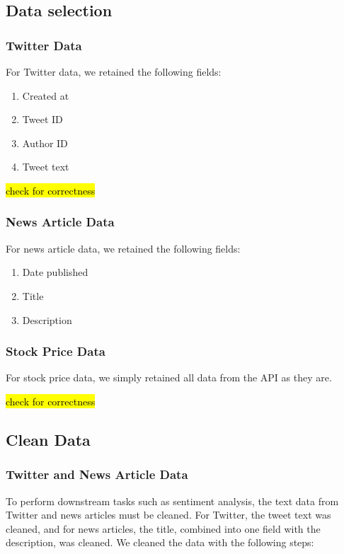 \documentclass[sigconf, nonacm]{acmart}
\begin{document}
\subsection{Data selection} %
\subsubsection{Twitter Data}
For Twitter data, we retained the following fields:
\begin{enumerate}
    \item Created at
    \item Tweet ID
    \item Author ID
    \item Tweet text
\end{enumerate}

\hl{check for correctness}

\subsubsection{News Article Data}
For news article data, we retained the following fields:

\begin{enumerate}
    \item Date published
    \item Title
    \item Description
\end{enumerate}

\subsubsection{Stock Price Data}
For stock price data, we simply retained all data from the API as they are.

\hl{check for correctness}

\subsection{Clean Data} 
\subsubsection{Twitter and News Article Data}
To perform downstream tasks such as sentiment analysis, the text data from Twitter and news articles must be cleaned. For Twitter, the tweet text was cleaned, and for news articles, the title, combined into one field with the description, was cleaned. We cleaned the data with the following steps:
\end{document}
